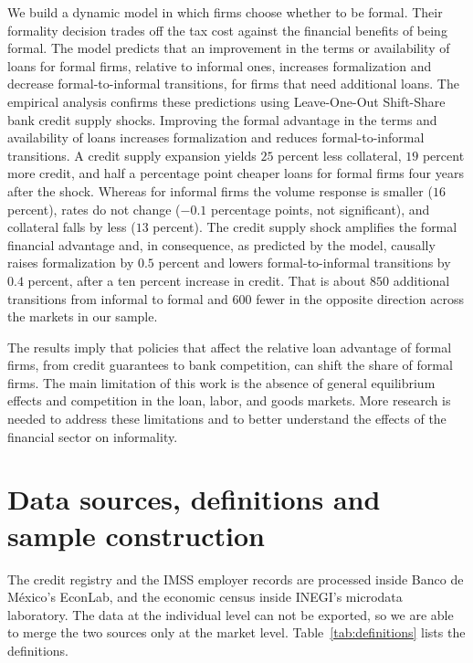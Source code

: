 \documentclass[12pt]{article}
\begin{document}
We build a dynamic model in which firms choose whether to be formal. Their formality decision trades off the tax cost against the financial benefits of being formal. The model predicts that an improvement in the terms or availability of loans for formal firms, relative to informal ones, increases formalization and decrease formal-to-informal transitions, for firms that need additional loans. The empirical analysis confirms these predictions using Leave-One-Out Shift-Share bank credit supply shocks. Improving the formal advantage in the terms and availability of loans increases formalization and reduces formal-to-informal transitions. A credit supply expansion yields $25$ percent less collateral, $19$ percent more credit, and half a percentage point cheaper loans for formal firms four years after the shock. Whereas for informal firms the volume response is smaller ($16$ percent), rates do not change ($-0.1$ percentage points, not significant), and collateral falls by less ($13$ percent). The credit supply shock amplifies the formal financial advantage and, in consequence, as predicted by the model, causally raises formalization by $0.5$ percent and lowers formal-to-informal transitions by $0.4$ percent, after a ten percent increase in credit. That is about  $850$ additional transitions from informal to formal and $600$ fewer in the opposite direction across the markets in our sample.

The results imply that policies that affect the relative loan advantage of formal firms, from credit guarantees to bank competition, can shift the share of formal firms. The main limitation of this work is the absence of general equilibrium effects and competition in the loan, labor, and goods markets. More research is needed to address these limitations and to better understand the effects of the financial sector on informality. 

\newpage



\newpage

\appendix

\section{Data sources, definitions and sample construction}
\label{app:data}

The credit registry and the IMSS employer records are processed inside Banco de México's EconLab, and the economic census inside INEGI's microdata laboratory. The data at the individual level can not be exported, so we are able to merge the two sources only at the market level. Table~\ref{tab:definitions} lists the definitions.
\end{document}
